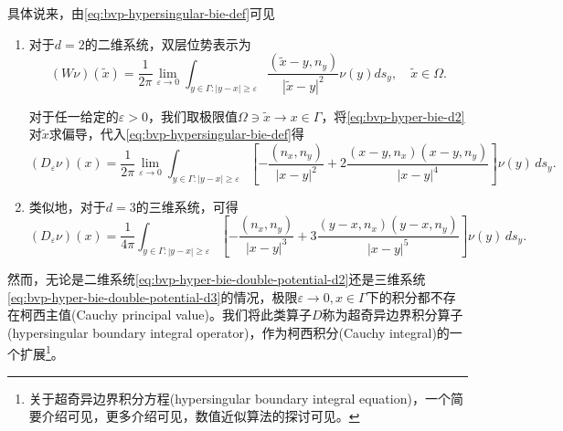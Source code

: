 具体说来，由\eqref{eq:bvp-hypersingular-bie-def}可见
\begin{enumerate}
\item 对于$d=2$的二维系统，双层位势表示为
\begin{equation}
  \label{eq:bvp-hyper-bie-d2}
  \left( W \nu \right)(\widetilde{x}) =
  \frac{1}{2 \pi} \lim_{\varepsilon \rightarrow 0}
  \int_{y \in \Gamma: \left| y -x \right| \ge \varepsilon}
  \frac{\left( \widetilde{x} - y, n_y \right)}{\left| \widetilde{x} - y \right|^2} \nu(y) d s_y, \quad \widetilde{x} \in \Omega.
\end{equation}

对于任一给定的$\varepsilon > 0$，我们取极限值$\Omega \ni \widetilde{x} \rightarrow  x \in \Gamma$，将\eqref{eq:bvp-hyper-bie-d2}对$\widetilde{x}$求偏导，代入\eqref{eq:bvp-hypersingular-bie-def}得
\begin{equation}
  \label{eq:bvp-hyper-bie-double-potential-d2}
  \left( D_{\varepsilon} \nu \right)(x)
  = \frac{1}{2 \pi}
  \lim_{\varepsilon \rightarrow 0}
  \int_{y \in \Gamma: \left| y - x \right| \ge \varepsilon}
  \left[
  - \frac{\left( n_x, n_y \right)}{\left| x - y \right|^2}
  + 2 \frac{
  \left( x - y, n_x \right)
  \left( x - y, n_y \right)
  }{
  \left| x - y \right|^4
  }
  \right]
  \nu(y) \, d s_y.
\end{equation}

\item 类似地，对于$d=3$的三维系统，可得
\begin{equation}
  \label{eq:bvp-hyper-bie-double-potential-d3}
  \left( D_{\varepsilon} \nu \right)(x)
  = \frac{1}{4 \pi}
  \int_{y \in \Gamma: \left| y - x \right| \ge \varepsilon}
  \left[
  - \frac{\left( n_x, n_y \right)}{\left| x - y \right|^{3}}
  + 3 \frac{
  \left( y - x, n_x \right)
  \left( y - x, n_y \right)
  }{
  \left| x - y \right|^{5}
  }
  \right]
  \nu(y) \, d s_y.
\end{equation}
\end{enumerate}

然而，无论是二维系统\eqref{eq:bvp-hyper-bie-double-potential-d2}还是三维系统\eqref{eq:bvp-hyper-bie-double-potential-d3}的情况，极限$\varepsilon \rightarrow 0, x \in \Gamma$下的积分都不存在柯西主值(Cauchy principal value)。我们将此类算子$D$称为超奇异边界积分算子(hypersingular boundary integral operator)，作为柯西积分(Cauchy integral)的一个扩展\footnote{关于超奇异边界积分方程(hypersingular boundary integral equation)，一个简要介绍可见\cite[Ch.9]{Mason:2003tc}，更多介绍可见\cite{Lifanov:2003va, Ang:2013vv}，数值近似算法的探讨可见\cite{Guiggiani:1992cm}。}。


